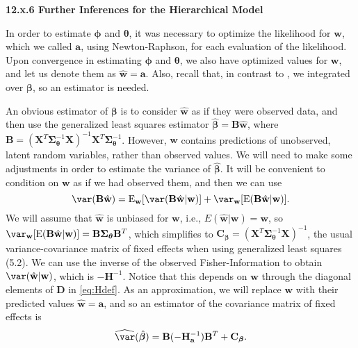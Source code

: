 \documentclass[12pt, titlepage]{article}
\begin{document}
\vspace{.5cm}
{\large \flushleft \textbf{12.x.6 Further Inferences for the Hierarchical Model}}
\vspace{.5cm}

In order to estimate $\boldsymbol{\phi}$ and $\boldsymbol{\theta}$, it was necessary to optimize the likelihood for $\mathbf{w}$, which we called $\mathbf{a}$, using Newton-Raphson, for each evaluation of the likelihood.  Upon convergence in estimating $\boldsymbol{\phi}$ and $\boldsymbol{\theta}$, we also have optimized values for $\mathbf{w}$, and let us denote them as $\hat{\mathbf{w}} = \mathbf{a}$.  Also, recall that, in contrast to \citet{bonat_practical_2016}, we integrated over $\boldsymbol{\beta}$, so an estimator is needed.

An obvious estimator of $\boldsymbol{\beta}$ is to consider $\hat{\mathbf{w}}$ as if they were observed data, and then use the generalized least squares estimator $\hat{\boldsymbol{\beta}} = \mathbf{B}\hat{\mathbf{w}}$, where $\mathbf{B} = (\mathbf{X}^{T}\boldsymbol{\Sigma}_{\boldsymbol{\theta}}^{-1}\mathbf{X})^{-1}\mathbf{X}^{T}\boldsymbol{\Sigma}_{\boldsymbol{\theta}}^{-1}$.  However, $\mathbf{w}$ contains predictions of unobserved, latent random variables, rather than observed values.  We will need to make some adjustments in order to estimate the variance of $\hat{\boldsymbol{\beta}}$.  It will be convenient to condition on $\mathbf{w}$ as if we had observed them, and then we can use
$$
\var(\mathbf{B}\hat{\mathbf{w}}) = \textrm{E}_{\mathbf{w}}[\var(\mathbf{B}\hat{\mathbf{w}}|\mathbf{w})] + \var_{\mathbf{w}}[\textrm{E}(\mathbf{B}\hat{\mathbf{w}}|\mathbf{w})].
$$
We will assume that $\hat{\mathbf{w}}$ is unbiased for $\mathbf{w}$, i.e., $E(\hat{\mathbf{w}}|\mathbf{w}) = \mathbf{w}$, so $\var_{\mathbf{w}}[\textrm{E}(\mathbf{B}\hat{\mathbf{w}}|\mathbf{w})] = \mathbf{B}\boldsymbol{\Sigma_{\boldsymbol{\theta}}}\mathbf{B}^{T}$, which simplifies to $\mathbf{C}_{\boldsymbol{\beta}} = (\mathbf{X}^{T}\boldsymbol{\Sigma}_{\boldsymbol{\theta}}^{-1}\mathbf{X})^{-1}$, the usual variance-covariance matrix of fixed effects when using generalized least squares (5.2). We can use the inverse of the observed Fisher-Information to obtain $\var(\hat{\mathbf{w}}|\mathbf{w})$, which is $-\mathbf{H}^{-1}$.  Notice that this depends on $\mathbf{w}$ through the diagonal elements of $\mathbf{D}$ in \eqref{eq:Hdef}.  As an approximation, we will replace $\mathbf{w}$ with their predicted values $\hat{\mathbf{w}} = \mathbf{a}$, and so an estimator of the covariance matrix of fixed effects is
\begin{equation} \label{eq:sglmm_varfe}
\widehat{\var}(\hat{\boldsymbol{\beta}}) = \mathbf{B}(-\mathbf{H}_{\mathbf{a}}^{-1})\mathbf{B}^{T} + \mathbf{C}_{\boldsymbol{\beta}}.
\end{equation}
\end{document}
